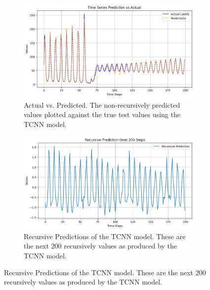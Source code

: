 \documentclass[conference]{IEEEtran}
\begin{document}
\begin{figure}[H]        
    \begin{subfigure}{0.45\textwidth}
        \includegraphics[scale=0.8]{pictures/actual_vs_pred.png}
        \caption{Actual vs. Predicted. The non-recursively predicted values plotted against the
        true test values using the TCNN model.}
        \label{fig:actual_vs_predtcnn}
    \end{subfigure}
    
    \vspace{0.5cm} %
    
    \begin{subfigure}{0.45\textwidth}
        \includegraphics[scale=0.8]{pictures/recursive_predictions.png}
        \caption{Recursive Predictions of the TCNN model. These are the next $200$ recursively
        values as produced by the TCNN model.}
    \end{subfigure}
\end{figure}
\end{document}
